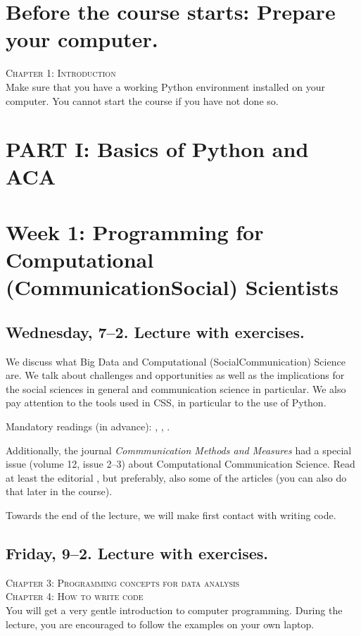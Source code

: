 \section*{Before the course starts: Prepare your computer.}
\textsc{ Chapter 1: Introduction}\\
Make sure that you have a working Python environment installed on your computer. You cannot start the course if you have not done so.

\section*{PART I: Basics of Python and ACA}

\section*{Week 1: Programming for Computational (Communication\textbar Social) Scientists}
\subsection*{Wednesday, 7--2. Lecture with exercises.}
We discuss what Big Data and Computational (Social\textbar Communication) Science are. We talk about challenges and opportunities as well as the implications for the social sciences in general and communication science in particular. We also pay attention to the tools used in CSS, in particular to the use of Python.

Mandatory readings (in advance):  \cite{boyd2012}, \cite{Kitchin2014}, \cite{Hilbert2019}.

Additionally, the journal \textit{Commmunication Methods and Measures} had a special issue (volume 12, issue 2--3) about Computational Communication Science. Read at least the editorial \citep{VanAtteveldt2018a}, but preferably, also some of the articles (you can also do that later in the course).

Towards the end of the lecture, we will make first contact with writing code.


\subsection*{Friday, 9--2. Lecture with exercises.}
\textsc{ Chapter 3: Programming concepts for data analysis}\\
\textsc{ Chapter 4: How to write code}\\

You will get a very gentle introduction to computer programming. During the lecture, you are encouraged to follow the examples on your own laptop.

